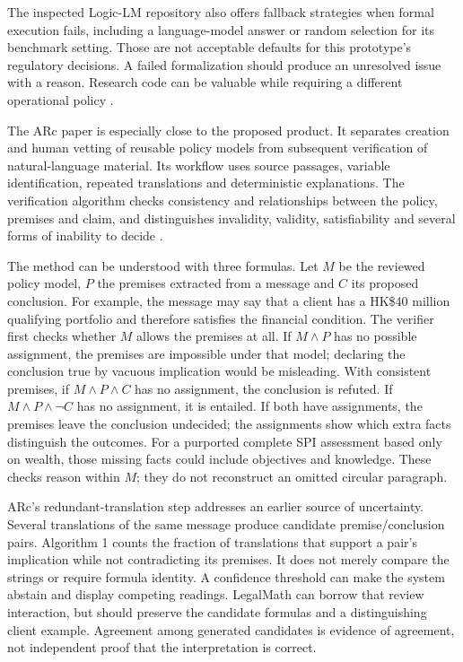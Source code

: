 The inspected Logic-LM repository also offers fallback strategies when formal
execution fails, including a language-model answer or random selection for its
benchmark setting. Those are not acceptable defaults for this prototype's
regulatory decisions. A failed formalization should produce an unresolved issue
with a reason. Research code can be valuable while requiring a different
operational policy \citep{libraryreview}.

The ARc paper is especially close to the proposed product. It separates creation
and human vetting of reusable policy models from subsequent verification of
natural-language material. Its workflow uses source passages, variable
identification, repeated translations and deterministic explanations. The
verification algorithm checks consistency and relationships between the policy,
premises and claim, and distinguishes invalidity, validity, satisfiability and
several forms of inability to decide
\citep[sec.~3 and Algorithm~1]{arc2025}.

The method can be understood with three formulas. Let $M$ be the reviewed policy
model, $P$ the premises extracted from a message and $C$ its proposed conclusion.
For example, the message may say that a client has a HK\$40 million qualifying
portfolio and therefore satisfies the financial condition. The verifier first
checks whether $M$ allows the premises at all. If $M\land P$ has no possible
assignment, the premises are impossible under that model; declaring the
conclusion true by vacuous implication would be misleading. With consistent
premises, if $M\land P\land C$ has no assignment, the conclusion is refuted.
If $M\land P\land\neg C$ has no assignment, it is entailed. If both have
assignments, the premises leave the conclusion undecided; the assignments show
which extra facts distinguish the outcomes. For a purported complete SPI
assessment based only on wealth, those missing facts could include objectives
and knowledge. These checks reason within $M$; they do not reconstruct an
omitted circular paragraph.

ARc's redundant-translation step addresses an earlier source of uncertainty.
Several translations of the same message produce candidate premise/conclusion
pairs. Algorithm 1 counts the fraction of translations that support a pair's
implication while not contradicting its premises. It does not merely compare
the strings or require formula identity. A confidence threshold can make the
system abstain and display competing readings. LegalMath can borrow that
review interaction, but should preserve the candidate formulas and a
distinguishing client example. Agreement among generated candidates is evidence
of agreement, not independent proof that the interpretation is correct.

